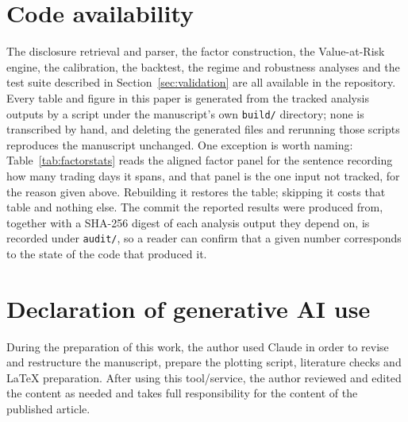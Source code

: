 \section*{Code availability}
The disclosure retrieval and parser, the factor construction, the
Value-at-Risk engine, the calibration, the backtest, the regime and robustness
analyses and the test suite described in Section~\ref{sec:validation} are all
available in the repository. Every table and figure in this paper is generated
from the tracked analysis outputs by a script under the manuscript's own
\texttt{build/} directory; none is transcribed by hand, and deleting the
generated files and rerunning those scripts reproduces the manuscript
unchanged. One exception is worth naming: Table~\ref{tab:factorstats} reads
the aligned factor panel for the sentence recording how many trading days it
spans, and that panel is the one input not tracked, for the reason given
above. Rebuilding it restores the table; skipping it costs that table and
nothing else. The commit the reported results were produced from, together with a
SHA-256 digest of each analysis output they depend on, is recorded under
\texttt{audit/}, so a reader can confirm that a given number corresponds to the
state of the code that produced it.

\section*{Declaration of generative AI use}
During the preparation of this work, the author used Claude in order to revise
and restructure the manuscript, prepare the plotting script, literature checks
and LaTeX preparation. After using this tool/service, the author reviewed and
edited the content as needed and takes full responsibility for the content of
the published article.
